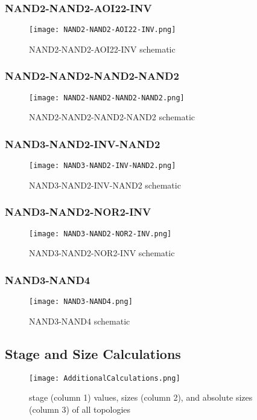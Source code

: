 \documentclass[conference]{IEEEtran}
\begin{document}
\subsubsection{NAND2-NAND2-AOI22-INV}\hspace{1mm}
\begin{figure}[H]
\center
\texttt{[image: NAND2-NAND2-AOI22-INV.png]}
\caption{NAND2-NAND2-AOI22-INV schematic}
\end{figure}

\subsubsection{NAND2-NAND2-NAND2-NAND2}\hspace{1mm}
\begin{figure}[H]
\center
\texttt{[image: NAND2-NAND2-NAND2-NAND2.png]}
\caption{NAND2-NAND2-NAND2-NAND2 schematic}
\end{figure}

\subsubsection{NAND3-NAND2-INV-NAND2}\hspace{1mm}
\begin{figure}[H]
\center
\texttt{[image: NAND3-NAND2-INV-NAND2.png]}
\caption{NAND3-NAND2-INV-NAND2 schematic}
\end{figure}

\subsubsection{NAND3-NAND2-NOR2-INV}\hspace{1mm}
\begin{figure}[H]
\center
\texttt{[image: NAND3-NAND2-NOR2-INV.png]}
\caption{NAND3-NAND2-NOR2-INV schematic}
\end{figure}

\subsubsection{NAND3-NAND4}\hspace{1mm}
\begin{figure}[H]
\center
\texttt{[image: NAND3-NAND4.png]}
\caption{NAND3-NAND4 schematic}
\end{figure}
\newpage


\onecolumn
\subsection{Stage and Size Calculations}
       \begin{figure}[H]
       \center
          \texttt{[image: AdditionalCalculations.png]}
          \caption{stage (column 1) values, sizes (column 2), and absolute sizes (column 3) of all topologies }
          \label{fig:AllTopologyCalcs}
        \end{figure}
\newpage
\end{document}
